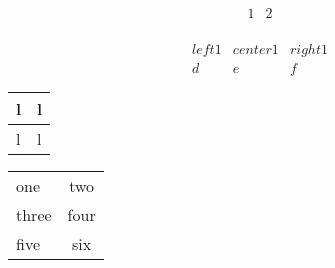 \documentclass[12pt]{article}
\begin{document}
\[\begin{array}{|l|c|} \hline 1 & 2\\ \end{array}\]


\[
\begin{array}{|l|cr}
  left1 & center1 & right1\\
  \hline
  d & e & f
\end{array} 
\]

\begin{tabular}{l|l}
  l & l\\
  \hline
  l & l\\
\end{tabular}

\noindent\begin{tabular}{|l|c|}
  \rowcolor{maroon}
  one & two \\
  \rowcolor{maroon!50}
  three & four \\
  \rowcolor{maroon!10}
  five & six
\end{tabular}
\end{document}
